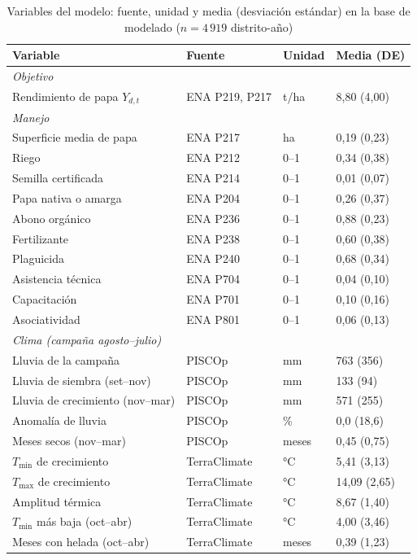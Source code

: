 \documentclass[conference,letterpaper]{IEEEtran}
\begin{document}
\begin{table}[!t]
\caption{Variables del modelo: fuente, unidad y media (desviación estándar) en la base de modelado ($n=4\,919$ distrito-año)}
\label{tab:vars}
\centering
\footnotesize
\setlength{\tabcolsep}{3pt}
\begin{tabular}{llll}
\toprule
Variable & Fuente & Unidad & Media (DE) \\
\midrule
\multicolumn{4}{l}{\textit{Objetivo}} \\
Rendimiento de papa $Y_{d,t}$ & ENA P219, P217 & t/ha & 8,80 (4,00) \\
\midrule
\multicolumn{4}{l}{\textit{Manejo}} \\
Superficie media de papa & ENA P217 & ha & 0,19 (0,23) \\
Riego & ENA P212 & 0--1 & 0,34 (0,38) \\
Semilla certificada & ENA P214 & 0--1 & 0,01 (0,07) \\
Papa nativa o amarga & ENA P204 & 0--1 & 0,26 (0,37) \\
Abono orgánico & ENA P236 & 0--1 & 0,88 (0,23) \\
Fertilizante & ENA P238 & 0--1 & 0,60 (0,38) \\
Plaguicida & ENA P240 & 0--1 & 0,68 (0,34) \\
Asistencia técnica & ENA P704 & 0--1 & 0,04 (0,10) \\
Capacitación & ENA P701 & 0--1 & 0,10 (0,16) \\
Asociatividad & ENA P801 & 0--1 & 0,06 (0,13) \\
\midrule
\multicolumn{4}{l}{\textit{Clima (campaña agosto--julio)}} \\
Lluvia de la campaña & PISCOp & mm & 763 (356) \\
Lluvia de siembra (set--nov) & PISCOp & mm & 133 (94) \\
Lluvia de crecimiento (nov--mar) & PISCOp & mm & 571 (255) \\
Anomalía de lluvia & PISCOp & \% & 0,0 (18,6) \\
Meses secos (nov--mar) & PISCOp & meses & 0,45 (0,75) \\
$T_{\min}$ de crecimiento & TerraClimate & °C & 5,41 (3,13) \\
$T_{\max}$ de crecimiento & TerraClimate & °C & 14,09 (2,65) \\
Amplitud térmica & TerraClimate & °C & 8,67 (1,40) \\
$T_{\min}$ más baja (oct--abr) & TerraClimate & °C & 4,00 (3,46) \\
Meses con helada (oct--abr) & TerraClimate & meses & 0,39 (1,23) \\
\bottomrule
\end{tabular}
\end{table}
\end{document}
